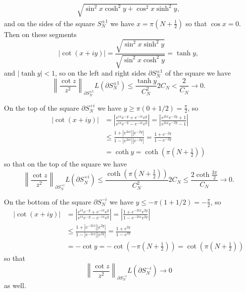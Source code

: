 \documentclass{article}
\begin{document}
\begin{Answer}
\begin{enumerate}[(i)]
{\begin{align*}
              {\sqrt{
                 \sin^2 x \cosh^2 y
               + \cos^2 x \sinh^2 y
              }},
      \end{align*}
      and on the sides of the square $S_N^{\pm 1}$ we have
      $x = \pi\left(N + \frac{1}{2}\right)$ so that $\cos x = 0$. Then
      on these segments
      $$
        |\cot (x + i y)|
      = \frac{\sqrt{\sin^2 x \sinh^2 y}}
             {\sqrt{\sin^2 x \cosh^2 y}}
      = \tanh y,
      $$
      and $|\tanh y| < 1$, so on the left and right sides
      $\partial S_N^{\pm 1}$ of the square we have
      $$
           \left\|\frac{\cot z}{z^2}\right\|_{\partial S_N^{\pm 1}}
           L(\partial S_N^{\pm 1})
      \leq \frac{\tanh y}{C_N^2} 2 C_N
      <    \frac{2}{C_N} \to 0.
      $$

      On the top of the square $\partial S_N^{+i}$
      we have $y \geq \pi(0 + 1/2) = \frac{\pi}{2}$, so
      \begin{align*}
            \left| \cot(x + i y) \right|
      &=    \left|
              \frac{e^{ix} e^{-y} + e^{-ix} e^y}
                   {e^{ix} e^{-y} - e^{-ix} e^y}
            \right|
       =    \left|
              \frac{e^{2ix} e^{-2y} + 1}
                   {e^{2ix} e^{-2y} - 1}
            \right| \\
      &\leq \frac{1 + |e^{2ix}||e^{-2y}|}
                 {1 - |e^{2ix}||e^{-2y}|}
       =    \frac{1 + e^{-2y}}
                 {1 - e^{-2y}} \\
      &=    \coth y
       =    \coth \left(\pi\left(N + \frac{1}{2}\right)\right)
      \end{align*}
      so that on the top of the square we have
      $$
           \left\|
             \frac{\cot z}{z^2}
           \right\|_{\partial S_N^{+i}}
           L(\partial S_N^{+i})
      \leq \frac{\coth \left(\pi\left(N + \frac{1}{2}\right)\right)}
                {C_N^2}
           2C_N
      \leq \frac{2 \coth \frac{3 \pi}{2}}
                {C_N} \to 0.
      $$

      On the bottom of the square $\partial S_N^{-i}$ we have
      $y \leq -\pi(1 + 1/2) = -\frac{\pi}{2}$, so
      \begin{align*}
            \left| \cot(x + i y) \right|
      &=    \left|
              \frac{e^{ix} e^{-y} + e^{-ix} e^y}
                   {e^{ix} e^{-y} - e^{-ix} e^y}
            \right|
       =    \left|
              \frac{1 + e^{-2ix} e^{2y}}
                   {1 - e^{-2ix} e^{2y}}
            \right| \\
      &\leq \frac{1 + |e^{-2ix}||e^{2y}|}
                 {1 - |e^{-2ix}||e^{2y}|}
       =    \frac{1 + e^{2y}}
                 {1 - e^{2y}} \\
      &= -\cot y
       = -\cot \left( -\pi \left(N + \frac{1}{2}\right) \right)
       = \cot \left( \pi \left(N + \frac{1}{2}\right) \right)
      \end{align*}
      so that
      $$
           \left\|
             \frac{\cot z}{z^2}
           \right\|_{\partial S_N^{-i}}
           L(\partial S_N^{-i})
      \to  0
      $$
      as well.

}
\end{enumerate}
\end{Answer}
\end{document}
